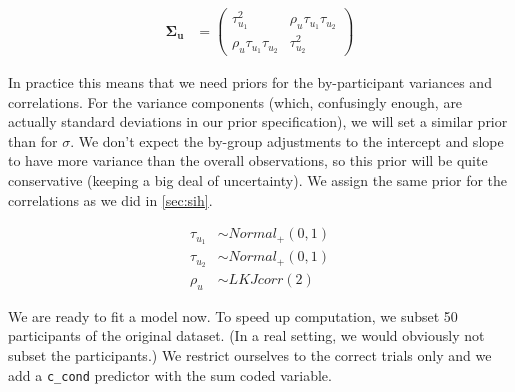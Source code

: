 \documentclass[12pt,]{krantz}
\newenvironment{Shaded}{\begin{snugshade}}{\end{snugshade}}
\newcommand{\CommentTok}[1]{\textcolor[rgb]{0.56,0.35,0.01}{\textit{#1}}}
\newcommand{\DataTypeTok}[1]{\textcolor[rgb]{0.13,0.29,0.53}{#1}}
\newcommand{\DecValTok}[1]{\textcolor[rgb]{0.00,0.00,0.81}{#1}}
\newcommand{\KeywordTok}[1]{\textcolor[rgb]{0.13,0.29,0.53}{\textbf{#1}}}
\newcommand{\NormalTok}[1]{#1}
\newcommand{\OperatorTok}[1]{\textcolor[rgb]{0.81,0.36,0.00}{\textbf{#1}}}
\newcommand{\StringTok}[1]{\textcolor[rgb]{0.31,0.60,0.02}{#1}}
\theoremstyle{definition}
\theoremstyle{definition}
\theoremstyle{definition}
\theoremstyle{remark}
\begin{document}
\begin{equation}
\begin{aligned}
 \boldsymbol{\Sigma_u} & = 
{\begin{pmatrix} 
\tau_{u_1}^2 & \rho_u \tau_{u_1} \tau_{u_2} \\ 
\rho_u \tau_{u_1} \tau_{u_2} & \tau_{u_2}^2
\end{pmatrix}}
\end{aligned}
\end{equation}

In practice this means that we need priors for the by-participant variances and correlations. For the variance components (which, confusingly enough, are actually standard deviations in our prior specification), we will set a similar prior than for \(\sigma\). We don't expect the by-group adjustments to the intercept and slope to have more variance than the overall observations, so this prior will be quite conservative (keeping a big deal of uncertainty). We assign the same prior for the correlations as we did in \ref{sec:sih}.

\begin{equation}
\begin{aligned}
\tau_{u_1} &\sim Normal_+(0,1)\\
\tau_{u_2} &\sim Normal_+(0,1)\\
\rho_u &\sim LKJcorr(2) 
\end{aligned}
\end{equation}

We are ready to fit a model now. To speed up computation, we subset 50 participants of the original dataset. (In a real setting, we would obviously not subset the participants.)
We restrict ourselves to the correct trials only and we add a \texttt{c\_cond} predictor with the sum coded variable.

\begin{Shaded}
\end{Shaded}
\end{document}
